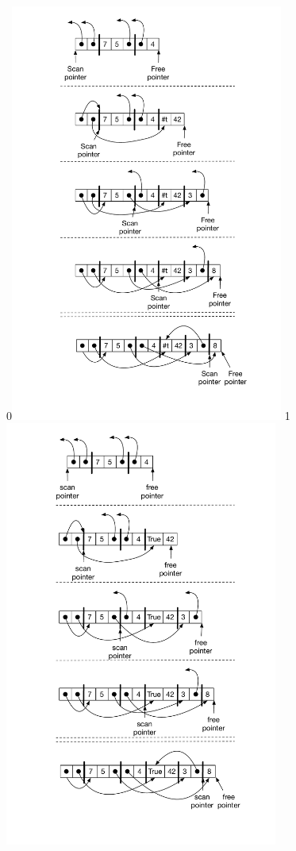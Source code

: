 \documentclass[7x10]{TimesAPriori_MIT}%
\def\racketEd{0}
\def\pythonEd{1}
\def\edition{1}
\newcommand{\racket}[1]{{\if\edition\racketEd{#1}\fi}}
\newcommand{\pythonColor}[0]{}
\newcommand{\python}[1]{{\if\edition\pythonEd\pythonColor #1\fi}}
\numberwithin{theorem}{chapter}
\numberwithin{definition}{chapter}
\numberwithin{equation}{chapter}
\begin{document}
\begin{figure}[tbp]
\centering
\begin{tcolorbox}[colback=white]
\racket{\includegraphics[width=0.8\textwidth]{figs/cheney}}
\python{\includegraphics[width=0.8\textwidth]{figs/cheney-python}}
\end{tcolorbox}


\end{figure}
\end{document}

